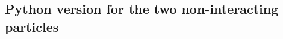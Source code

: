 \documentclass[%
oneside,                 %
final,                   %
10pt]{article}
\begin{document}
\subsection*{Python version for the two non-interacting particles}
\end{document}
